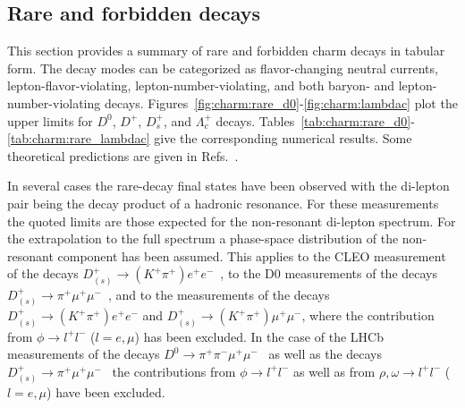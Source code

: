 \subsection{Rare and forbidden decays}
\label{sec:charm:rare}

This section provides a summary of rare and forbidden charm decays
in tabular form. The decay modes can be categorized as 
flavor-changing neutral currents, lepton-flavor-violating, 
lepton-number-violating, and both baryon- and lepton-number-violating decays.
Figures~\ref{fig:charm:rare_d0}-\ref{fig:charm:lambdac} plot the 
upper limits for $D^0$, $D^+$, $D_s^+$, and $\Lambda_c^+$ decays. 
Tables~\ref{tab:charm:rare_d0}-\ref{tab:charm:rare_lambdac} give the 
corresponding numerical results. Some theoretical predictions are given in 
Refs.~\cite{Burdman:2001tf,Fajfer:2002bu,Fajfer:2007dy,Golowich:2009ii,Paul:2010pq,Borisov:2011aa}.

In several cases the rare-decay final states have been observed with the di-lepton pair being the decay product of a hadronic resonance.
For these measurements the quoted limits are those expected for the non-resonant di-lepton spectrum.
For the extrapolation to the full spectrum a phase-space distribution of the non-resonant component has been assumed.
This applies to the CLEO measurement of the decays $D_{(s)}^+\to(K^+\pi^+)e^+e^-$~\cite{Rubin:2010cq}, to the D0 measurements of the decays $D_{(s)}^+\to\pi^+\mu^+\mu^-$~\cite{Abazov:2007aj}, and to the \babar measurements of the decays $D_{(s)}^+\to(K^+\pi^+)e^+e^-$ and $D_{(s)}^+\to(K^+\pi^+)\mu^+\mu^-$, where the contribution from $\phi\to l^+l^-$ ($l=e,\mu$) has been excluded.
In the case of the LHCb measurements of the decays $D^0\to\pi^+\pi^-\mu^+\mu^-$~\cite{Aaij:2013uoa} as well as the decays $D_{(s)}^+\to\pi^+\mu^+\mu^-$~\cite{Aaij:2013sua} the contributions from $\phi\to l^+l^-$ as well as from $\rho,\omega\to l^+l^-$ ($l=e,\mu$) have been excluded. 

